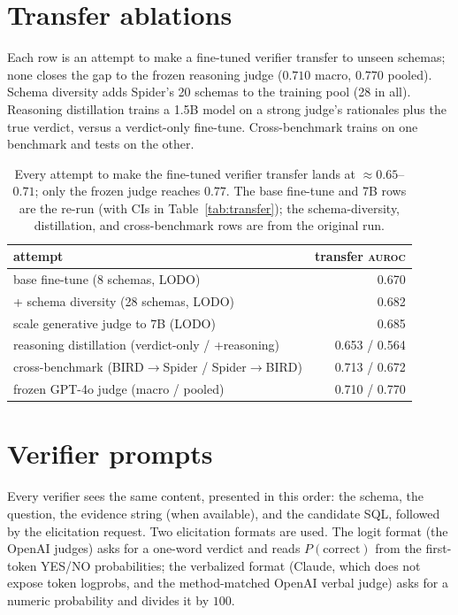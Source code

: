 \documentclass[11pt]{article}
\newcommand{\auroc}{\textsc{auroc}}
\begin{document}
\section{Transfer ablations}
\label{app:transfer}
Each row is an attempt to make a fine-tuned verifier transfer to unseen schemas; none closes the gap
to the frozen reasoning judge ($0.710$ macro, $0.770$ pooled). Schema diversity adds Spider's 20
schemas to the training pool (28 in all). Reasoning distillation trains a 1.5B model on a strong
judge's rationales plus the true verdict, versus a verdict-only fine-tune. Cross-benchmark trains on
one benchmark and tests on the other.
\begin{table}[h]\centering
\begin{tabular}{lr}
\toprule
attempt & transfer \auroc{} \\
\midrule
base fine-tune (8 schemas, LODO) & 0.670 \\
+ schema diversity (28 schemas, LODO) & 0.682 \\
scale generative judge to 7B (LODO) & 0.685 \\
reasoning distillation (verdict-only / +reasoning) & 0.653 / 0.564 \\
cross-benchmark (BIRD$\rightarrow$Spider / Spider$\rightarrow$BIRD) & 0.713 / 0.672 \\
\midrule
frozen GPT-4o judge (macro / pooled) & 0.710 / 0.770 \\
\bottomrule
\end{tabular}
\caption{Every attempt to make the fine-tuned verifier transfer lands at $\approx0.65$--$0.71$; only the
frozen judge reaches $0.77$. The base fine-tune and 7B rows are the re-run (with CIs in
Table~\ref{tab:transfer}); the schema-diversity, distillation, and cross-benchmark rows are from the
original run.}\end{table}

\section{Verifier prompts}
\label{app:prompts}
Every verifier sees the same content, presented in this order: the schema, the question, the evidence
string (when available), and the candidate SQL, followed by the elicitation request. Two elicitation
formats are used. The logit format (the OpenAI judges) asks for a one-word verdict and reads
$P(\text{correct})$ from the first-token YES/NO probabilities; the verbalized format (Claude, which
does not expose token logprobs, and the method-matched OpenAI verbal judge) asks for a numeric
probability and divides it by $100$.
\end{document}
